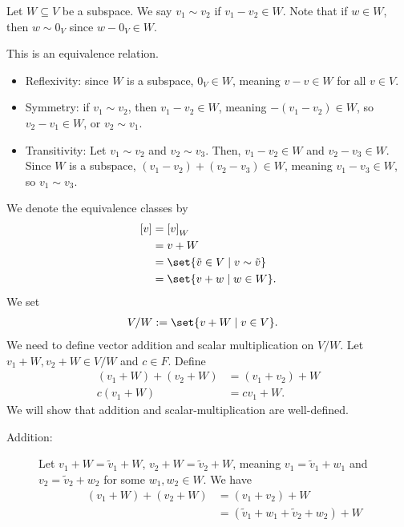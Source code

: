 \documentclass[10pt]{mypackage}
\begin{document}
\begin{definition}
  Let $W\subseteq V$ be a subspace. We say $v_1\sim v_2$ if $v_1 - v_2 \in W$. Note that if $w\in W$, then $w\sim 0_V$ since $w-0_V\in W$.\newline

  This is an equivalence relation.
  \begin{itemize}
    \item Reflexivity: since $W$ is a subspace, $0_V\in W$, meaning $v-v\in W$ for all $v\in V$.
    \item Symmetry: if $v_1\sim v_2$, then $v_1 - v_2 \in W$, meaning $-\left(v_1 - v_2\right)\in W$, so $v_2 - v_1\in W$, or $v_2 \sim v_1$.
    \item Transitivity: Let $v_1\sim v_2$ and $v_2\sim v_3$. Then, $v_1 - v_2\in W$ and $v_2 - v_3\in W$. Since $W$ is a subspace, $\left(v_1 - v_2\right) + \left(v_2 - v_3\right)\in W$, meaning $v_1 - v_3 \in W$, so $v_1 \sim v_3$.
  \end{itemize}
  We denote the equivalence classes by
  \begin{align*}
    \left[v\right] &= \left[v\right]_W\\
                   &= v+W\\
                   &= \set{\tilde{v}\in V\mid v\sim \tilde{v}}\\
                   &= \set{v+w\mid w\in W}.
  \end{align*}
  We set
  \begin{align*}
    V/W &:= \set{v + W\mid v\in V}.
  \end{align*}
  We need to define vector addition and scalar multiplication on $V/W$. Let $v_1 + W,v_2 + W\in V/W$ and $c\in F$. Define
  \begin{align*}
    \left(v_1 + W\right) + \left(v_2 + W\right) &= \left(v_1 + v_2\right) + W\\
    c\left(v_1 + W\right) &= cv_1 + W.
  \end{align*}
  We will show that addition and scalar-multiplication are well-defined.
  \begin{description}
    \item[Addition:] Let $v_1 + W = \tilde{v}_1 + W$, $v_2 + W = \tilde{v}_2 + W$, meaning $v_1 = \tilde{v}_1 + w_1$ and $v_2 = \tilde{v}_2 + w_2$ for some $w_1,w_2 \in W$. We have
      \begin{align*}
        \left(v_1 + W\right) + \left(v_2 + W\right) &= \left(v_1 + v_2\right) + W\\
                                                    &= \left(\tilde{v}_1 + w_1 + \tilde{v}_2 + w_2\right) + W\\

\end{align*}
\end{description}
\end{definition}
\end{document}
